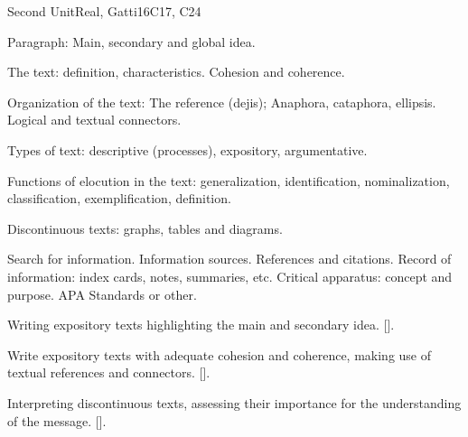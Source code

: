 \begin{syllabus}
\begin{unit}{}{Second Unit}{Real, Gatti}{16}{C17, C24}
\begin{topics}
   \item Paragraph: Main, secondary and global idea.
   \item The text: definition, characteristics. Cohesion and coherence.
   \item Organization of the text: The reference (dejis); Anaphora, cataphora, ellipsis. Logical and textual connectors.
   \item Types of text: descriptive (processes), expository, argumentative.
   \item Functions of elocution in the text: generalization, identification, nominalization, classification, exemplification, definition.
   \item Discontinuous texts: graphs, tables and diagrams.
   \item Search for information. Information sources. References and citations. Record of information: index cards, notes, summaries, etc. Critical apparatus: concept and purpose. APA Standards or other.
\end{topics}
\begin{learningoutcomes}
   \item Writing expository texts highlighting the main and secondary idea. [\Usage].
   \item Write expository texts with adequate cohesion and coherence, making use of textual references and connectors. [\Usage].
   \item Interpreting discontinuous texts, assessing their importance for the understanding of the message. [\Usage].
\end{learningoutcomes}
\end{unit}


\end{syllabus}

